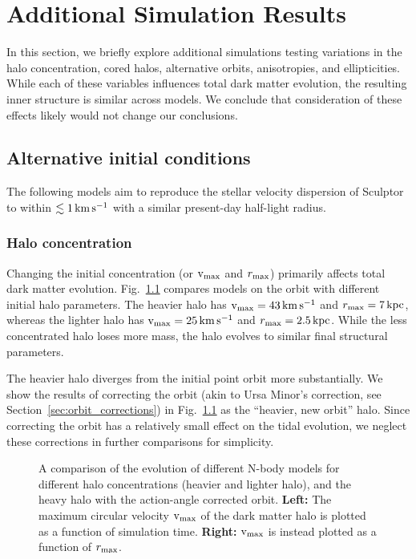 \chapter{Additional Simulation Results}\label{sec:extra_results}

In this section, we briefly explore additional simulations testing
variations in the halo concentration, cored halos, alternative orbits,
anisotropies, and ellipticities. While each of these variables
influences total dark matter evolution, the resulting inner structure is
similar across models. We conclude that consideration of these effects
likely would not change our conclusions.

\section{Alternative initial
conditions}\label{alternative-initial-conditions}

The following models aim to reproduce the stellar velocity dispersion of
Sculptor to within \(\lesssim 1\,{\rm km\,s^{-1}}\) with a similar present-day
half-light radius.

\subsection{Halo concentration}\label{halo-concentration}

Changing the initial concentration (or \({\rm v}_{\rm max}\) and \(r_{\rm max}\))
primarily affects total dark matter evolution.
Fig.~\ref{fig:tidal_tracks_concentration} compares models on the
\smallperi{} orbit with different initial halo parameters. The heavier
halo has \({\rm v}_{\rm max}=43\,{\rm km\,s^{-1}}\) and \(r_{\rm max}=7\,{\rm kpc}\), whereas the lighter
halo has \({\rm v}_{\rm max}=25\,{\rm km\,s^{-1}}\) and \(r_{\rm max}=2.5\,{\rm kpc}\). While the less
concentrated halo loses more mass, the halo evolves to similar final
structural parameters.

The heavier halo diverges from the initial point orbit more
substantially. We show the results of correcting the orbit (akin to Ursa
Minor's correction, see Section~\ref{sec:orbit_corrections}) in
Fig.~\ref{fig:tidal_tracks_concentration} as the ``heavier, new orbit''
halo. Since correcting the orbit has a relatively small effect on the
tidal evolution, we neglect these corrections in further comparisons for
simplicity.

\begin{figure}
\centering
{}
\caption[Tidal dependence on halo concentration]{A comparison of the
evolution of different N-body models for different halo concentrations
(heavier and lighter halo), and the heavy halo with the action-angle
corrected orbit. \textbf{Left:} The maximum circular velocity \({\rm v}_{\rm max}\)
of the dark matter halo is plotted as a function of simulation time.
\textbf{Right:} \({\rm v}_{\rm max}\) is instead plotted as a function of
\(r_{\rm max}\).}\label{fig:tidal_tracks_concentration}
\end{figure}

